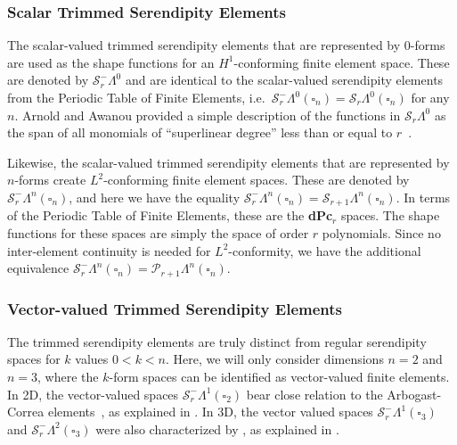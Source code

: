 \documentclass[format=acmsmall,screen,timestamp=false,a4paper]{acmart}
\newcommand{\calP}{\mathcal{P}}
\newcommand{\calS}{\mathcal{S}}
\begin{document}
	
	
  \subsubsection{Scalar Trimmed Serendipity Elements}
  The scalar-valued trimmed serendipity elements that are represented by $0$-forms are used as the shape functions for an $H^1$-conforming finite element space.  These are denoted by $\calS_r^-\Lambda^0$ and are identical to the scalar-valued serendipity elements from the Periodic Table of Finite Elements, i.e.\ $\calS_r^-\Lambda^0(\square_n) = \calS_r\Lambda^0(\square_n)$ for any $n$.  Arnold and Awanou provided a simple description of the functions in $\mathcal{S}_r\Lambda^0$ as the span of all monomials of ``superlinear degree'' less than or equal to $r$~\cite{arnold2011serendipity}. 
  
  Likewise, the scalar-valued trimmed serendipity elements that are represented by $n$-forms create $L^2$-conforming finite element spaces.  These are denoted by $\calS_r^-\Lambda^n(\square_n)$, and here we have the equality $\calS_r^-\Lambda^n(\square_n) = \calS_{r+1}\Lambda^n(\square_n)$.  In terms of the Periodic Table of Finite Elements, these are the \textbf{dPc}$_r$ spaces.  The shape functions for these spaces are simply the space of order $r$ polynomials.  Since no inter-element continuity is needed for $L^2$-conformity, we have the additional equivalence $\calS_r^-\Lambda^n(\square_n) = \calP_{r+1}\Lambda^n(\square_n)$.
  
  \subsubsection{Vector-valued Trimmed Serendipity Elements}
  

	The trimmed serendipity elements are truly distinct from regular serendipity spaces for $k$ values $0<k<n$.  Here, we will only consider dimensions $n=2$ and $n=3$, where the $k$-form spaces can be identified as vector-valued finite elements.  	
	In 2D, the vector-valued spaces $\calS_r^-\Lambda^1(\square_2)$ bear close relation to the Arbogast-Correa elements~\citep{arbogast2016two}, as explained in \citet[Prop 2.2]{gillette2019trimmed}.
	In 3D, the vector valued spaces $\calS_r^-\Lambda^1(\square_3)$ and $\calS_r^-\Lambda^2(\square_3)$ were also characterized by \citet{CF2016}, as explained in \citet[Prop 2.3]{gillette2019trimmed}.
\end{document}
